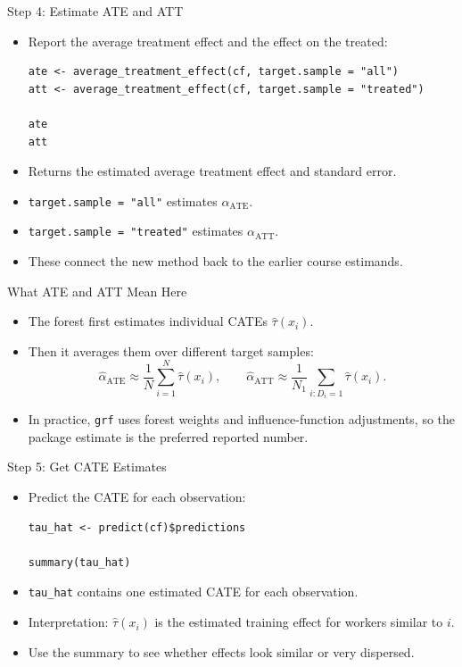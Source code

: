 \documentclass[hyperref={pdfpagelabels=false}]{beamer}
\begin{document}
\begin{frame}[fragile]{Step 4: Estimate ATE and ATT}
\begin{itemize}
  \item Report the average treatment effect and the effect on the treated:
\begin{lstlisting}[style=r-style]
ate <- average_treatment_effect(cf, target.sample = "all")
att <- average_treatment_effect(cf, target.sample = "treated")

ate
att
\end{lstlisting}
  \vspace{0.1cm}
  \item Returns the estimated average treatment effect and standard error.
  \item \texttt{target.sample = "all"} estimates $\alpha_{\text{ATE}}$.
  \item \texttt{target.sample = "treated"} estimates $\alpha_{\text{ATT}}$.
  \item These connect the new method back to the earlier course estimands.
\end{itemize}
\end{frame}

\begin{frame}{What ATE and ATT Mean Here}
\begin{itemize}
  \item The forest first estimates individual CATEs $\hat{\tau}(x_i)$.
  \vspace{0.2cm}
  \item Then it averages them over different target samples:
  \[
    \hat{\alpha}_{\text{ATE}}
    \approx
    \frac{1}{N}\sum_{i=1}^N\hat{\tau}(x_i),
    \qquad
    \hat{\alpha}_{\text{ATT}}
    \approx
    \frac{1}{N_1}\sum_{i:D_i=1}\hat{\tau}(x_i).
  \]
  \vspace{0.2cm}
  \item In practice, \texttt{grf} uses forest weights and influence-function adjustments, so the package estimate is the preferred reported number.
\end{itemize}
\end{frame}

\begin{frame}[fragile]{Step 5: Get CATE Estimates}
\begin{itemize}
  \item Predict the CATE for each observation:
\begin{lstlisting}[style=r-style]
tau_hat <- predict(cf)$predictions

summary(tau_hat)
\end{lstlisting}
  \vspace{0.1cm}
  \item \texttt{tau\_hat} contains one estimated CATE for each observation.
  \item Interpretation: $\hat{\tau}(x_i)$ is the estimated training effect for workers similar to $i$.
  \item Use the summary to see whether effects look similar or very dispersed.
\end{itemize}
\end{frame}
\end{document}
